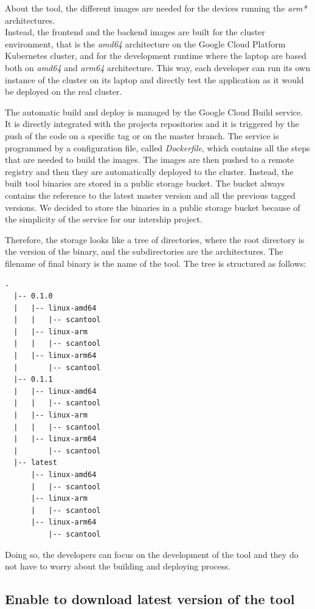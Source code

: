 About the tool, the different images are needed for the devices running the \textit{arm*} architectures. \\
Instead, the frontend and the backend images are built for the cluster environment, that is the \textit{amd64} architecture on the Google Cloud Platform Kubernetes cluster, and for the development runtime where the laptop are based both on \textit{amd64} and \textit{arm64} architecture. This way, each developer can run its own instance of the cluster on its laptop and directly test the application as it would be deployed on the real cluster.

The automatic build and deploy is managed by the Google Cloud Build service. It is directly integrated with the projects repositories and it is triggered by the push of the code on a specific tag or on the master branch. The service is programmed by a configuration file, called \textit{Dockerfile}, which contains all the steps that are needed to build the images. The images are then pushed to a remote registry and then they are automatically deployed to the cluster. Instead, the built tool binaries are stored in a public storage bucket. The bucket always contains the reference to the latest master version and all the previous tagged versions. We decided to store the binaries in a public storage bucket because of the simplicity of the service for our intership project.

Therefore, the storage looks like a tree of directories, where the root directory is the version of the binary, and the subdirectories are the architectures. The filename of final binary is the name of the tool. The tree is structured as follows:

\begin{lstlisting}[caption={Storage bucket tree of directories}]
  .
  |-- 0.1.0
  |   |-- linux-amd64
  |   |   |-- scantool
  |   |-- linux-arm
  |   |   |-- scantool
  |   |-- linux-arm64
  |       |-- scantool
  |-- 0.1.1
  |   |-- linux-amd64
  |   |   |-- scantool
  |   |-- linux-arm
  |   |   |-- scantool
  |   |-- linux-arm64
  |       |-- scantool
  |-- latest
      |-- linux-amd64
      |   |-- scantool
      |-- linux-arm
      |   |-- scantool
      |-- linux-arm64
          |-- scantool
\end{lstlisting}

Doing so, the developers can focus on the development of the tool and they do not have to worry about the building and deploying process.

\subsection{Enable to download latest version of the tool}

